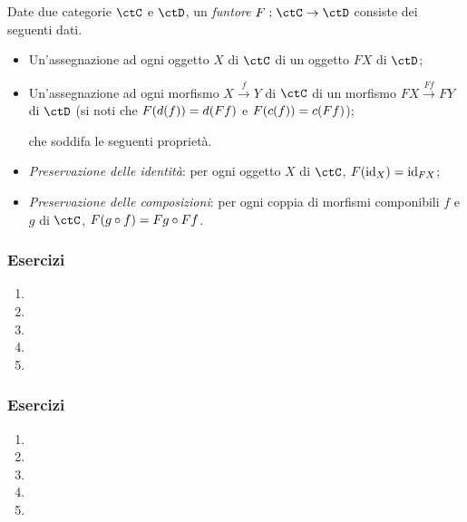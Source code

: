 \begin{definition}
 Date due categorie $\ctC$ e $\ctD$, un \emph{funtore} $F:\ctC\to\ctD$ consiste dei seguenti dati.
 \begin{itemize}
  \item Un'assegnazione ad ogni oggetto $X$ di $\ctC$ di un oggetto $FX$ di $\ctD$;
  \item Un'assegnazione ad ogni morfismo $X \xrightarrow{f} Y$ di $\ctC$ di un morfismo $FX \xrightarrow{Ff} FY$ di $\ctD$ (si noti che $F(d(f))=d(Ff)$ e $F(c(f))=c(Ff)$);

  che soddifa le seguenti proprietà.
  \item \emph{Preservazione delle identità}: per ogni oggetto $X$ di $\ctC$, $F(\mathrm{id}_X)=\mathrm{id}_{FX}$;
  \item \emph{Preservazione delle composizioni}: per ogni coppia di morfismi componibili $f$ e $g$ di $\ctC$, $F(g\circ f)=Fg\circ Ff$.
 \end{itemize}
\end{definition}



\subsubsection*{Esercizi}
\begin{enumerate}
    \item
    \item
    \item
    \item
    \item
\end{enumerate}

\subsubsection*{Esercizi}
\begin{enumerate}
    \item
    \item
    \item
    \item
    \item
\end{enumerate}


